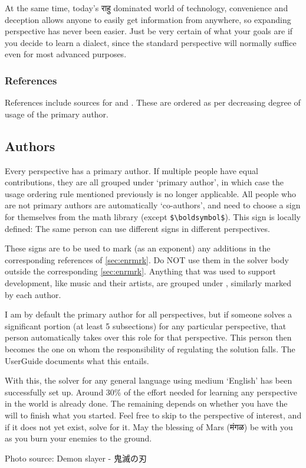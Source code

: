 At the same time, today's \textsanskrit{राहु} dominated world of technology, convenience and deception allows anyone to easily  get information from anywhere, so expanding perspective has never been easier. Just be very certain of what your goals are if you decide to learn a dialect, since the standard perspective will normally suffice even for most advanced purposes.
\subsubsection{References}
References include sources for  and  . These are ordered as per decreasing  degree of usage of the primary author.
\subsection{Authors}
Every perspective has a primary author. If multiple people have equal contributions, they are all grouped under `primary author', in which case the usage ordering rule mentioned previously is no longer applicable. All people who are not primary authors are automatically `co-authors', and need to choose a sign for themselves from the math library (except \verb|$\boldsymbol$|). This sign is locally defined: The same person can use different signs in different perspectives. 

These signs are to be used to mark (as an exponent) any additions in the corresponding references of \autoref{sec:enrmrk}.  Do NOT use them in the solver body outside the corresponding \autoref{sec:enrmrk}.  Anything that was used to support development, like music and their artists, are grouped under , similarly marked by each author.

I am by default the primary author for all perspectives, but if someone  solves a significant portion (at least 5  subsections) for any particular perspective, that person automatically takes over this role for that perspective. This person then becomes the one on whom the responsibility of regulating the solution falls. The UserGuide documents what this entails.

With this, the solver for any general language using  medium `English' has been successfully set up. Around 30\% of the effort needed for learning any perspective in the world is already done. The remaining depends on whether you have the will to finish what you started. Feel free to skip to the perspective of interest, and if it does not yet exist, solve for it. May the blessing of {\color{red}Mars (\textsanskrit{मंगळ})} be with you as you burn your enemies to the ground.
\begin{center}
    \large
\hyperref[toc]{\textcolor{cyan}{}}
\end{center}
Photo source: Demon slayer - \textjapanese{鬼滅の刃}
